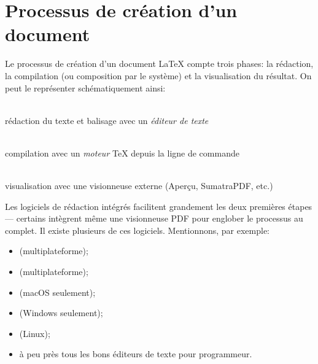 \section{Processus de création d'un document}
\label{sec:presentation:processus}

Le processus de création d'un document {\LaTeX} compte trois phases:
la rédaction, la compilation (ou composition par le système) et la
visualisation du résultat. On peut le représenter schématiquement
ainsi:
\begin{center}
  \begin{minipage}[t]{0.25\linewidth}
    \centering
    {\Huge\faFileTextO} \\ \medskip
    rédaction du texte et balisage avec un \emph{éditeur de texte}
  \end{minipage}
  \quad{\Large\faArrowRight}\quad
  \begin{minipage}[t]{0.25\linewidth}
    \centering
    {\Huge\faCogs} \\ \medskip
    compilation avec un \emph{moteur} {\TeX} depuis la ligne de commande
  \end{minipage}
  \quad{\Large\faArrowRight}\quad
  \begin{minipage}[t]{0.25\linewidth}
    \centering
    {\Huge\faFilePdfO} \\ \medskip
    visualisation avec une visionneuse externe (Aperçu,
    SumatraPDF, etc.)
  \end{minipage}
\end{center}

Les logiciels de rédaction intégrés facilitent grandement les deux
premières étapes --- certains intègrent même une visionneuse PDF pour
englober le processus au complet. Il existe plusieurs de ces
logiciels. Mentionnons, par exemple:
\begin{itemize}
\item {}
  (multiplateforme);
\item {} (multiplateforme);
\item {} (macOS seulement);
\item {} (Windows seulement);
\item {} (Linux);
\item à peu près tous les bons éditeurs de texte pour programmeur.
\end{itemize}



